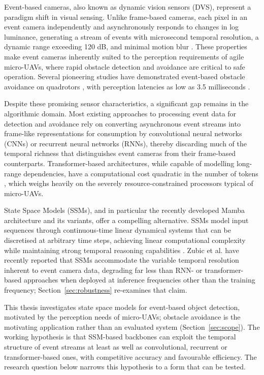 \documentclass[11pt, a4paper]{report}
\begin{document}
Event-based cameras, also known as dynamic vision sensors (DVS), represent a paradigm shift in visual sensing. Unlike frame-based cameras, each pixel in an event camera independently and asynchronously responds to changes in log luminance, generating a stream of events with microsecond temporal resolution, a dynamic range exceeding 120 dB, and minimal motion blur \cite{gallego2020event}. These properties make event cameras inherently suited to the perception requirements of agile micro-UAVs, where rapid obstacle detection and avoidance are critical to safe operation. Several pioneering studies have demonstrated event-based obstacle avoidance on quadrotors \cite{falanga2020dynamic, sanket2020evdodgenet}, with perception latencies as low as 3.5 milliseconds \cite{falanga2020dynamic}. 

Despite these promising sensor characteristics, a significant gap remains in the algorithmic domain. Most existing approaches to processing event data for detection and avoidance rely on converting asynchronous event streams into frame-like representations for consumption by convolutional neural networks (CNNs) or recurrent neural networks (RNNs), thereby discarding much of the temporal richness that distinguishes event cameras from their frame-based counterparts. Transformer-based architectures, while capable of modelling long-range dependencies, have a computational cost quadratic in the number of tokens \cite{vaswani2017attention}, which weighs heavily on the severely resource-constrained processors typical of micro-UAVs. 

State Space Models (SSMs), and in particular the recently developed Mamba architecture and its variants, offer a compelling alternative. SSMs model input sequences through continuous-time linear dynamical systems that can be discretised at arbitrary time steps, achieving linear computational complexity while maintaining strong temporal reasoning capabilities \cite{gu2022efficiently}. Zubic et al. \cite{zubic2024state} have recently reported that SSMs accommodate the variable temporal resolution inherent to event camera data, degrading far less than RNN- or transformer-based approaches when deployed at inference frequencies other than the training frequency; Section~\ref{sec:robustness} re-examines that claim. 

This thesis investigates state space models for event-based object detection, motivated by the perception needs of micro-UAVs; obstacle avoidance is the motivating application rather than an evaluated system (Section~\ref{sec:scope}). The working hypothesis is that SSM-based backbones can exploit the temporal structure of event streams at least as well as convolutional, recurrent or transformer-based ones, with competitive accuracy and favourable efficiency. The research question below narrows this hypothesis to a form that can be tested. 
\end{document}
